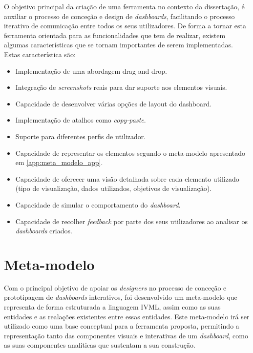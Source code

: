 O objetivo principal da criação de uma ferramenta no contexto da dissertação, é auxiliar o processo de conceção e design de \textit{dashboards}, facilitando o processo iterativo de comunicação entre todos os seus utilizadores. De forma a tornar esta ferramenta orientada para as funcionalidades que tem de realizar, existem algumas características que se tornam importantes de serem implementadas. Estas característica são:

\begin{itemize}
  \item Implementação de uma abordagem drag-and-drop.
  \item Integração de \textit{screenshots} reais para dar suporte aos elementos visuais.
  \item Capacidade de desenvolver várias opções de layout do dashboard.
  \item Implementação de atalhos como \textit{copy-paste}.
  \item Suporte para diferentes perfis de utilizador.
  \item Capacidade de representar os elementos segundo o meta-modelo apresentado em \ref{app:meta_modelo_app}.
  \item Capacidade de oferecer uma visão detalhada sobre cada elemento utilizado (tipo de visualização, dados utilizados, objetivos de visualização).
  \item Capacidade de simular o comportamento do \textit{dashboard}.
  \item Capacidade de recolher \textit{feedback} por parte dos seus utilizadores ao analisar os \textit{dashboards} criados.
\end{itemize}

\section{Meta-modelo} %
\label{sec:meta_modelo}

Com o principal objetivo de apoiar os \textit{designers} no processo de conceção e prototipagem de \textit{dashboards} interativos, foi desenvolvido um meta-modelo que representa de forma estruturada a linguagem IVML, assim como as suas entidades e as realações existentes entre essas entidades. Este meta-modelo irá ser utilizado como uma base conceptual para a ferramenta proposta, permitindo a representação tanto das componentes visuais e interativas de um \textit{dashboard}, como as suas componentes analíticas que sustentam a sua construção.

